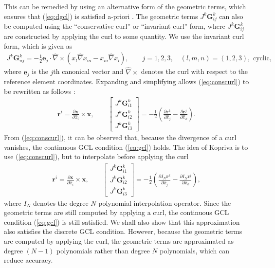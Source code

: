 \documentclass[preprint,10pt]{article}
\theoremstyle{definition}
\theoremstyle{lemma}
\theoremstyle{theorem}
\theoremstyle{assumption}
\renewcommand{\hat}{\widehat}
\newcommand{\pd}[2]{\frac{\partial#1}{\partial#2}}
\newcommand{\LRp}[1]{\left( #1 \right)}
\newcommand{\LRs}[1]{\left[ #1 \right]}
\newcommand{\Grad} {\ensuremath{\nabla}}
\begin{document}
{This can be remedied by using an alternative form of the geometric terms, which ensures that (\ref{eq:dgcl}) is satisfied a-priori \cite{visbal2002use, kopriva2006metric}.  The geometric terms $J^k\bm{G}^k_{ij}$ can also be computed using the ``conservative curl'' or ``invariant curl'' form, where $J^k\bm{G}^k_{ij}$ are constructed by applying the curl to some quantity.  We use the invariant curl form, which is given as
\begin{align}
J^k\bm{G}^k_{nj} = -\frac{1}{2}\bm{e}_j\cdot \hat{\Grad} \times \LRp{x_l\hat{\Grad}x_m - x_m\hat{\Grad}x_l}, \qquad j = 1,2,3, \quad (l,m,n) = (1,2,3), \text{ cyclic},
\label{eq:conscurl}
\end{align}
where $\bm{e}_j$ is the $j$th canonical vector and $\hat{\Grad} \times $ denotes the curl with respect to the reference element coordinates.  Expanding and simplifying allows (\ref{eq:conscurl}) to be rewritten as follows \cite{hindenlang2012explicit}:
\begin{align}
\bm{r}^i = \pd{\bm{x}}{\hat{x}_i}\times \bm{x}, \qquad
\LRs{\begin{array}{c}
J^k\bm{G}^k_{i1}\\
J^k\bm{G}^k_{i2}\\
J^k\bm{G}^k_{i3}\end{array}} = -\frac{1}{2}\LRp{\pd{\bm{r}^k}{\hat{x}_j}-\pd{\bm{r}^j}{\hat{x}_k}}.
\end{align}
From (\ref{eq:conscurl}), it can be observed that, because the divergence of a curl vanishes, the continuous GCL condition (\ref{eq:gcl}) holds.  
The idea of Kopriva is to use (\ref{eq:conscurl}), but to interpolate before applying the curl  %
\begin{align}
\bm{r}^i = { \pd{\bm{x}}{\hat{x}_i}\times \bm{x}}, \qquad
\LRs{\begin{array}{c}
J^k\bm{G}^k_{i1}\\
J^k\bm{G}^k_{i2}\\
J^k\bm{G}^k_{i3}\end{array}} = -\frac{1}{2}\LRp{\pd{I_N\bm{r}^k}{\hat{x}_j}-\pd{I_N\bm{r}^j}{\hat{x}_k}}, 
\label{eq:iconscurl}
\end{align}
where $I_N$ denotes the degree $N$ polynomial interpolation operator. Since the geometric terms are still computed by applying a curl, the continuous GCL condition (\ref{eq:gcl}) is still satisfied. We shall also show that this approximation also satisfies the discrete GCL condition. However, because the geometric terms are computed by applying the curl, the geometric terms are approximated as degree $(N-1)$ polynomials rather than degree $N$ polynomials, which can reduce accuracy.  

}
\end{document}
